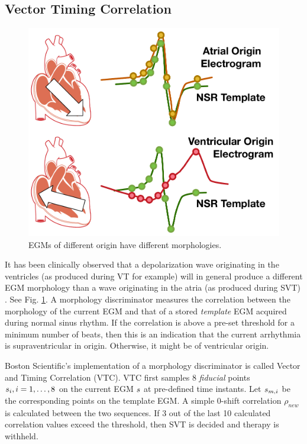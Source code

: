 \subsection{Vector Timing Correlation}
\label{sec:VTC}
\begin{figure}[t]
	\centering
	\vspace{-15pt}
	\includegraphics[scale=0.3]{figures/VTCEGMCompare}
	\caption{\small \acp{EGM} of different origin have different morphologies.}
	\label{fig:egmmorphology}
	\vspace{-10pt}
\end{figure}
It has been clinically observed that a depolarization wave originating in the ventricles (as produced during \ac{VT} for example) will in general produce a different \ac{EGM} morphology than a wave originating in the atria (as produced during \ac{SVT}) \cite{compass}.
See Fig. \ref{fig:egmmorphology}.
%
A morphology discriminator measures the correlation between the morphology of the current \ac{EGM} and that of a stored \emph{template} \ac{EGM} acquired during normal sinus rhythm.
If the correlation is above a pre-set threshold for a minimum number of beats, then this is an indication that the current arrhythmia is supraventricular in origin.
Otherwise, it might be of ventricular origin.

Boston Scientific's implementation of a morphology discriminator is called Vector and Timing Correlation (VTC).
VTC first samples 8 \emph{fiducial} points $s_i,i=1,\ldots,8$ on the current \ac{EGM} $s$ at pre-defined time instants.
Let $s_{m,i}$ be the corresponding points on the template \ac{EGM}.
A simple 0-shift correlation $\rho_{new}$ is calculated between the two sequences. 
If 3 out of the last 10 calculated correlation values exceed the threshold, then \ac{SVT} is decided and therapy is withheld.

